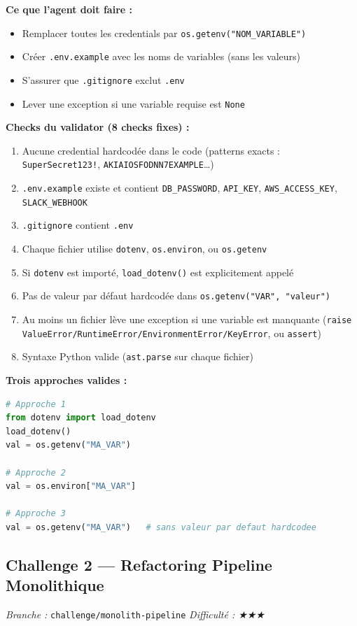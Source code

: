 \documentclass[11pt,a4paper]{article}
\newcommand{\code}[1]{\texttt{#1}}
\begin{document}
\textbf{Ce que l'agent doit faire :}
\begin{itemize}
  \item Remplacer toutes les credentials par \code{os.getenv("NOM\_VARIABLE")}
  \item Créer \code{.env.example} avec les noms de variables (sans les valeurs)
  \item S'assurer que \code{.gitignore} exclut \code{.env}
  \item Lever une exception si une variable requise est \code{None}
\end{itemize}

\textbf{Checks du validator (8 checks fixes) :}
\begin{enumerate}
  \item Aucune credential hardcodée dans le code
        (patterns exacts : \code{SuperSecret123!}, \code{AKIAIOSFODNN7EXAMPLE}\ldots)
  \item \code{.env.example} existe et contient \code{DB\_PASSWORD}, \code{API\_KEY},
        \code{AWS\_ACCESS\_KEY}, \code{SLACK\_WEBHOOK}
  \item \code{.gitignore} contient \code{.env}
  \item Chaque fichier utilise \code{dotenv}, \code{os.environ}, ou \code{os.getenv}
  \item Si \code{dotenv} est importé, \code{load\_dotenv()} est explicitement appelé
  \item Pas de valeur par défaut hardcodée dans \code{os.getenv("VAR", "valeur")}
  \item Au moins un fichier lève une exception si une variable est manquante
        (\code{raise ValueError/RuntimeError/EnvironmentError/KeyError}, ou \code{assert})
  \item Syntaxe Python valide (\code{ast.parse} sur chaque fichier)
\end{enumerate}

\textbf{Trois approches valides :}
\begin{lstlisting}[language=Python]
# Approche 1
from dotenv import load_dotenv
load_dotenv()
val = os.getenv("MA_VAR")

# Approche 2
val = os.environ["MA_VAR"]

# Approche 3
val = os.getenv("MA_VAR")   # sans valeur par defaut hardcodee
\end{lstlisting}

\subsection{Challenge 2 — Refactoring Pipeline Monolithique}
\textit{Branche :} \code{challenge/monolith-pipeline} \quad \textit{Difficulté : ★★★}
\end{document}
